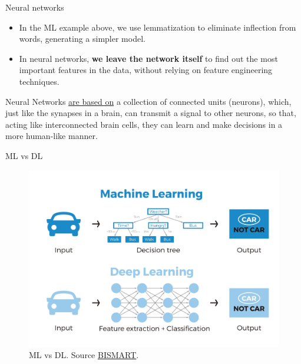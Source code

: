 \documentclass{beamer}
\begin{document}
\begin{frame}{Neural networks}
    \begin{itemize}
        \item In the ML example above, we use lemmatization to eliminate inflection from words, generating a simpler model.
        \item In neural networks, {\bf we leave the network itself} to find out the most important features in the data, without relying on feature engineering techniques. 
    \end{itemize}
    Neural Networks \href{https://towardsdatascience.com/deep-learning-with-python-neural-networks-complete-tutorial-6b53c0b06af0}{are based on} a collection of connected units (neurons), which, just like the synapses in a brain, can transmit a signal to other neurons, so that, acting like interconnected brain cells, they can learn and make decisions in a more human-like manner.
\end{frame}

\begin{frame}{ML vs DL}
    \begin{figure}
        \includegraphics[width=0.8\linewidth]{MLvsDL}
        \caption{ML vs DL. Source \href{https://blog.bismart.com/diferencia-machine-learning-deep-learning}{BISMART}.}
        \label{Fig:MLvsDL}
    \end{figure}
\end{frame}
\end{document}

